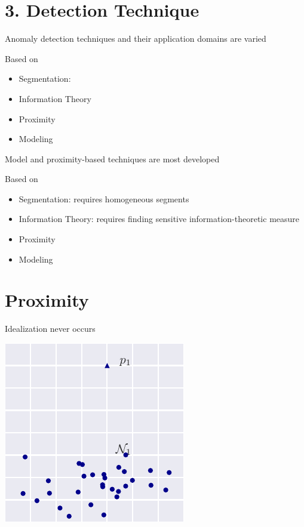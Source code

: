 \documentclass{beamer}
\begin{document}
  \section{3. Detection Technique}

  \begin{frame}{Anomaly detection techniques and their application domains are varied}

    Based on
    \begin{itemize}
    \item Segmentation:
    \item Information Theory
    \item Proximity 
    \item Modeling
    \end{itemize}

  \end{frame}

  \begin{frame}{Model and proximity-based techniques are most developed}

    Based on
    \begin{itemize}
    \item Segmentation: requires homogeneous segments
    \item Information Theory: requires finding sensitive information-theoretic measure
    \item Proximity
    \item Modeling
    \end{itemize}

  \end{frame}


  \section{Proximity}


  \begin{frame}{Idealization never occurs}

      \centering
      \includegraphics[height=\textheight]{figs/simple_dist.pdf}

  \end{frame}
\end{document}

